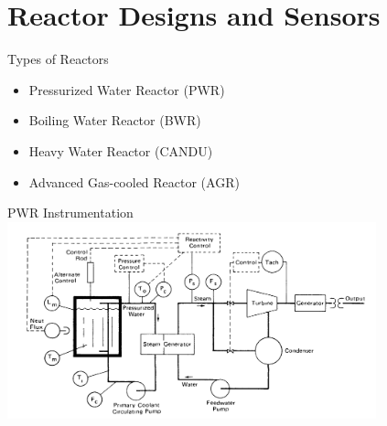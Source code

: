 \documentclass{beamer}
\begin{document}
\section{Reactor Designs and Sensors}

\begin{frame}{Types of Reactors}
  \begin{itemize}
    \item Pressurized Water Reactor (PWR)
    \item Boiling Water Reactor (BWR)
    \item Heavy Water Reactor (CANDU)
    \item Advanced Gas-cooled Reactor (AGR)
  \end{itemize}
\end{frame}

\begin{frame}{PWR Instrumentation}
  \centering
  \includegraphics[width=0.8\textwidth]{instrumentation.png}
\end{frame}
\end{document}
